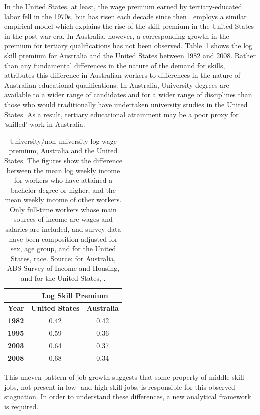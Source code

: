 \documentclass[a4paper,11pt]{article}
\begin{document}
In the United States, at least, the wage premium earned by tertiary-educated labor fell in the 1970s, but has risen each decade since then \citep{Acemoglu2011}. \citet{Katz1992} employs a similar empirical model which explains the rise of the skill premium in the United States in the post-war era. In Australia, however, a corresponding growth in the premium for tertiary qualifications has not been observed. Table~\ref{tbl:wagepremium} shows the log skill premium for Australia and the United States between 1982 and 2008. Rather than any fundamental differences in the nature of the demand for skills, \citet{Coelli2009} attributes this difference in Australian workers to differences in the nature of Australian educational qualifications. In Australia, University degrees are available to a wider range of candidates and for a wider range of disciplines than those who would traditionally have undertaken university studies in the United States. As a result, tertiary educational attainment may be a poor proxy for `skilled' work in Australia.
\begin{table}
  \centering
  \begin{tabular}{lcc}
  \hline
           & \multicolumn{2}{c}{\bf Log Skill Premium} \\
\hline
{\bf Year} &	{\bf United States} & {\bf Australia} \\
{\bf 1982} &	0.42 &	0.42 \\
{\bf 1995} &	0.59 &	0.36 \\
{\bf 2003} &	0.64 &	0.37 \\
{\bf 2008} &	0.68 &	0.34 \\ \hline
\end{tabular}
  \caption{University/non-university log wage premium, Australia and the United States. The figures show the difference between the mean log weekly income for workers who have attained a bachelor degree or higher, and the mean weekly income of other workers. Only full-time workers whose main sources of income are wages and salaries are included, and survey data have been composition adjusted for sex, age group, and for the United States, race. Source: for Australia, ABS Survey of Income and Housing, and for the United States, \citet{Acemoglu2011}.}
  \label{tbl:wagepremium}
\end{table}

This uneven pattern of job growth suggests that some property of middle-skill jobs, not present in low- and high-skill jobs, is responsible for this observed stagnation. In order to understand these differences, a new analytical framework is required.
\end{document}
